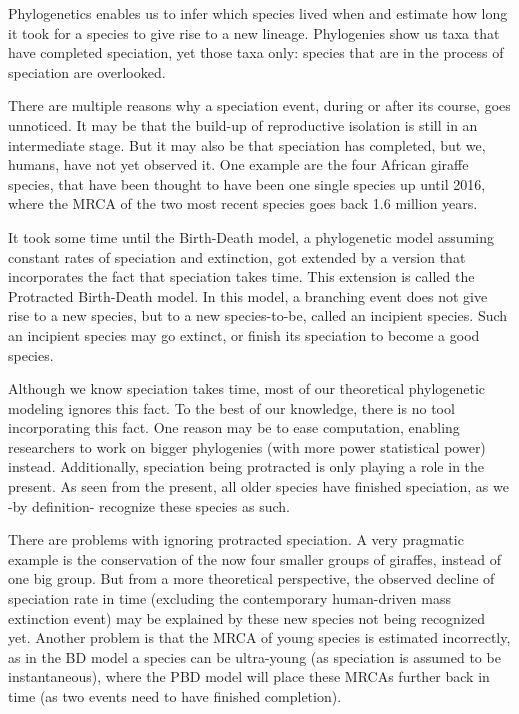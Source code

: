 \documentclass{article}
\begin{document}
Phylogenetics enables us to infer which species lived when and
estimate how long it took for a species to give rise to a new
lineage. Phylogenies show us taxa that have completed speciation, yet
those taxa only: species that are in the process of speciation are 
overlooked.

There are multiple reasons why a speciation event, during
or after its course, goes unnoticed. It may be that the build-up
of reproductive isolation is still in an intermediate stage. But it
may also be that speciation has completed, but we, humans, have not
yet observed it. One example are the four African giraffe species, 
that have been thought to have been one single species up until 2016,
where the MRCA of the two most recent species goes back 1.6 million years.

It took some time until the Birth-Death model, a phylogenetic model
assuming constant rates of speciation and extinction, got extended
by a version that incorporates the fact that speciation takes time.
This extension is called the Protracted Birth-Death model. In this
model, a branching event does not give rise to a new species, but to
a new species-to-be, called an incipient species. Such an incipient
species may go extinct, or finish its speciation to become a good species.

Although we know speciation takes time, most of our theoretical 
phylogenetic modeling ignores this fact. To the best of our knowledge,
there is no tool incorporating this fact. One reason may be to ease
computation, enabling researchers to work on bigger phylogenies (with
more power statistical power) instead. Additionally, speciation being
protracted is only playing a role in the present. As seen from the present,
all older species have finished speciation, as we -by definition- recognize
these species as such. 

There are problems with ignoring protracted speciation. A very pragmatic
example is the conservation of the now four smaller groups of giraffes,
instead of one big group. But from a more theoretical perspective, the
observed decline of speciation rate in time (excluding the contemporary human-driven
mass extinction event) may be explained by these new species not being 
recognized yet. Another problem is that the MRCA of young species is estimated 
incorrectly, as in the BD model a species can be ultra-young (as speciation
is assumed to be instantaneous), where the PBD model will place these MRCAs
further back in time (as two events need to have finished completion).
\end{document}
